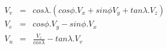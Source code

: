 \begin{eqnarray*}
V_v & = & cos \lambda . ( cos \phi.V_x + sin \phi V_y + tan \lambda . V_z) \\
V_e & = & cos \phi . V_y - sin \phi .V_x \\
V_n & = & \frac{V_z}{cos \lambda} - tan \lambda . V_v \\
\end{eqnarray*}
